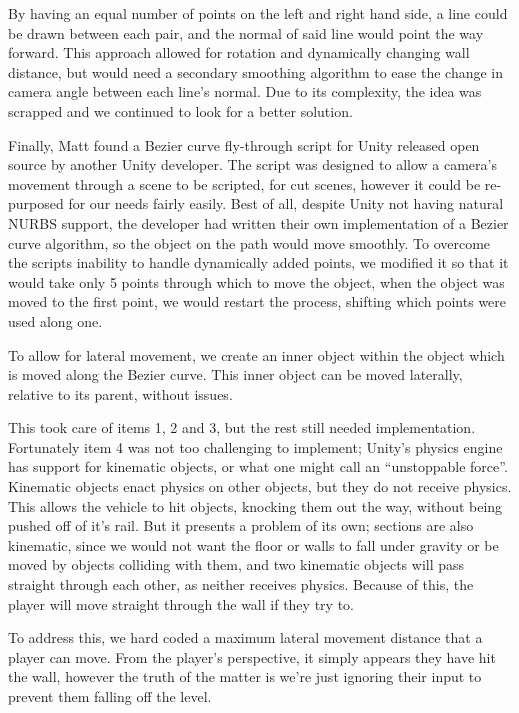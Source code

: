 \documentclass[a4paper,oneside]{memoir}
\begin{document}
			By having an equal number of points on the left and right hand side, a line could be drawn between each pair, and the normal of said line would point the way forward. This approach allowed for rotation and dynamically changing wall distance, but would need a secondary smoothing algorithm to ease the change in camera angle between each line's normal. Due to its complexity, the idea was scrapped and we continued to look for a better solution.

			Finally, Matt found a Bezier curve fly-through script for Unity released open source by another Unity developer\cite{Bezier}.
			The script was designed to allow a camera's movement through a scene to be scripted, for cut scenes, however it could be re-purposed for our needs fairly easily.
			Best of all, despite Unity not having natural NURBS support, the developer had written their own implementation of a Bezier curve algorithm, so the object on the path would move smoothly.
			To overcome the scripts inability to handle dynamically added points, we modified it so that it would take only 5 points through which to move the object, when the object was moved to the first point, we would restart the process, shifting which points were used along one.

			To allow for lateral movement, we create an inner object within the object which is moved along the Bezier curve. 
			This inner object can be moved laterally, relative to its parent, without issues.

			This took care of items 1, 2 and 3, but the rest still needed implementation. 
			Fortunately item 4 was not too challenging to implement; Unity's physics engine has support for kinematic objects, or what one might call an ``unstoppable force''.
			Kinematic objects enact physics on other objects, but they do not receive physics. 
			This allows the vehicle to hit objects, knocking them out the way, without being pushed off of it's rail.
			But it presents a problem of its own; sections are also kinematic, since we would not want the floor or walls to fall under gravity or be moved by objects colliding with them, and two kinematic objects will pass straight through each other, as neither receives physics.
			Because of this, the player will move straight through the wall if they try to.

			To address this, we hard coded a maximum lateral movement distance that a player can move.
			From the player's perspective, it simply appears they have hit the wall, however the truth of the matter is we're just ignoring their input to prevent them falling off the level.
\end{document}

